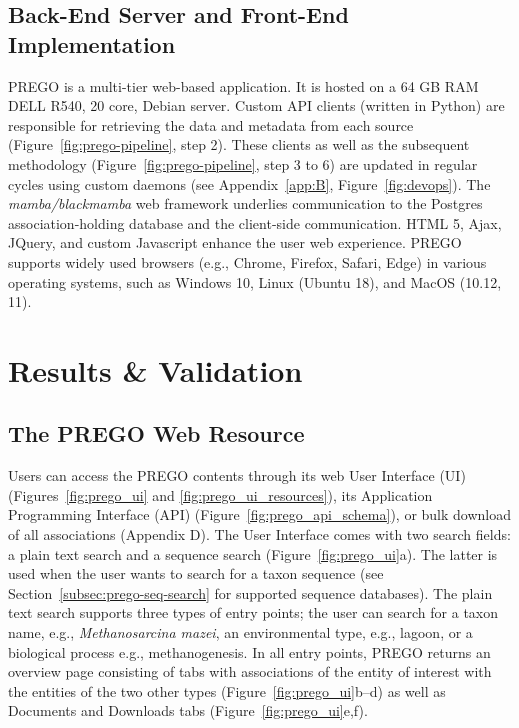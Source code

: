    \subsection{Back-End Server and Front-End Implementation}
   \label{subsec:prego-back-end}

   PREGO is a multi-tier web-based application. 
   It is hosted on a 64 GB RAM DELL R540, 20 core, Debian server. 
   Custom API clients (written in Python) are responsible for retrieving the data and metadata from each source (Figure~\ref{fig:prego-pipeline}, step 2). 
   These clients as well as the subsequent methodology (Figure~\ref{fig:prego-pipeline}, step 3 to 6) are updated in regular cycles using custom daemons (see Appendix~\ref{app:B}, Figure~\ref{fig:devops}). 
   The \textit{mamba/blackmamba} web framework underlies communication to the Postgres association-holding database and the client-side communication. 
   HTML 5, Ajax, JQuery, and custom Javascript enhance the user web experience. 
   PREGO supports widely used browsers (e.g., Chrome, Firefox, Safari, Edge) in various operating systems, such as Windows 10, Linux (Ubuntu 18), and MacOS (10.12, 11).


\section{Results \& Validation}
\label{sec:prego-results}

   \subsection{The PREGO Web Resource}
   \label{subsec:prego-web-resource}

   Users can access the PREGO contents through its web User Interface (UI) (Figures~\ref{fig:prego_ui} and \ref{fig:prego_ui_resources}), its Application Programming Interface (API) (Figure~\ref{fig:prego_api_schema}), or bulk download of all associations (Appendix D). 
   The User Interface comes with two search fields: a plain text search and a sequence search (Figure~\ref{fig:prego_ui}a). 
   The latter is used when the user wants to search for a taxon sequence (see Section~\ref{subsec:prego-seq-search} for supported sequence databases). 
   The plain text search supports three types of entry points; the user can search for a taxon name, e.g., \textit{Methanosarcina mazei}, an environmental type, e.g., lagoon, or a biological process e.g., methanogenesis. 
   In all entry points, PREGO returns an overview page consisting of tabs with associations of the entity of interest with the entities of the two other types (Figure~\ref{fig:prego_ui}b–d) as well as Documents and Downloads tabs (Figure~\ref{fig:prego_ui}e,f).


